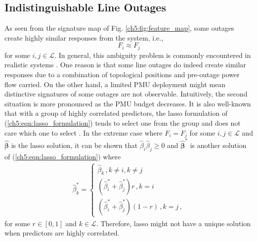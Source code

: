 \subsection{Indistinguishable Line Outages}
\label{ch5:sec:diagnosability}
As seen from the signature map of Fig. \ref{ch5:fig:feature_map}, some outages  create highly similar responses from the system, i.e., 
$$
F_i \approx F_j
$$ 
for some $i,j \in \mathcal{L}$. In general, this ambiguity problem is commonly encountered in realistic systems \cite{Wu2015}. One reason is that some line outages do indeed create similar responses due to a combination of topological positions and pre-outage power flow carried. On the other hand, a limited PMU deployment might mean distinctive signatures of some outages are not observable. Intuitively, the second situation is more pronounced as the PMU budget decreases. It is also well-known that with a group of highly correlated predictors, the lasso formulation of (\ref{ch5:eqn:lasso_formulation}) tends to select one from the group and does not care which one to select \cite{zou2005regularization}. In the extreme case where $F_{i} = F_{j}$ for some $i,j \in \mathcal{L}$ and $\boldsymbol{\hat{\beta}}$ is the lasso solution, it can be shown that $\hat{\beta}_{i}\hat{\beta}_{j} \ge 0 $ and $\boldsymbol{\hat{\beta}}^*$ is another solution of (\ref{ch5:eqn:lasso_formulation}) where
\begin{align}
\hat{\beta}^*_k = 
\begin{cases}
\hat{\beta}_k \,,  k \ne i, k \ne j \\
(\hat{\beta}^*_{i}+\hat{\beta}^*_{j}) r \,, k=i \\
(\hat{\beta}^*_{i}+\hat{\beta}^*_{j}) (1-r) \,, k=j \,,
\end{cases}
\end{align}
for some $r \in [0, 1]$ and $k \in \mathcal{L}$. Therefore, lasso might not have a unique solution when predictors are highly correlated.

